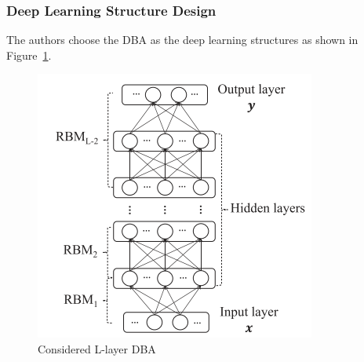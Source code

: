 \documentclass[11pt]{report}
\begin{document}
	\subsubsection{Deep Learning Structure Design}
	The authors choose the DBA as the deep learning structures as shown in Figure~\ref{1stfig}.
	\begin{figure}[h!]
		\centering
		\includegraphics[width=0.5\linewidth]{figure1.png}
		\caption{Considered L-layer DBA}
		\label{1stfig}
	\end{figure}
	
\end{document}
